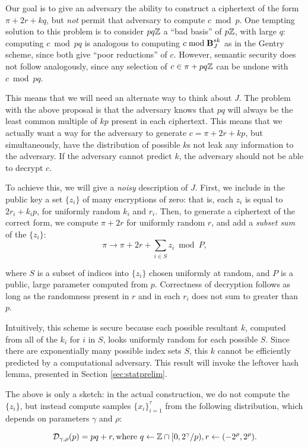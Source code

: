Our goal is to give an adversary the ability to construct a ciphertext of the form $\pi + 2r + kq$, but \emph{not} permit that adversary to compute $c \bmod p$. One tempting solution to this problem is to consider $pq \mathbb{Z}$ a ``bad basis'' of $p \mathbb{Z}$, with large $q$: computing $c \bmod pq$ is analogous to computing $c \bmod \textbf{B}_J^{sk}$ as in the Gentry scheme, since both give ``poor reductions'' of $c$. However, semantic security does not follow analogously, since any selection of $c \in \pi + pq \mathbb{Z}$ can be undone with $c \bmod pq$.

This means that we will need an alternate way to think about $J$. The problem with the above proposal is that the adversary knows that $pq$ will always be the least common multiple of $kp$ present in each ciphertext. This means that we actually want a way for the adversary to generate $c = \pi + 2r + kp$, but simultaneously, have the distribution of possible $k$s not leak any information to the adversary. If the adversary cannot predict $k$, the adversary should not be able to decrypt $c$.

To achieve this, we will give a \emph{noisy} description of $J$. First, we include in the public key a set $\{z_i\}$ of many encryptions of zero: that is, each $z_i$ is equal to $2r_{i} + k_{i}p$, for uniformly random $k_i$ and $r_i$. Then, to generate a ciphertext of the correct form, we compute $\pi + 2r$ for uniformly random $r$, and add a \emph{subset sum} of the $\{z_i\}$:
\[\pi \to \pi + 2r + \sum_{i \in S} z_i \bmod P,\]

where $S$ is a subset of indices into $\{z_i\}$ chosen uniformly at random, and $P$ is a public, large parameter computed from $p$. Correctness of decryption follows as long as the randomness present in $r$ and in each $r_i$ does not sum to greater than $p$.

Intuitively, this scheme is secure because each possible resultant $k$, computed from all of the $k_i$ for $i$ in $S$, looks uniformly random for each possible $S$. Since there are exponentially many possible index sets $S$, this $k$ cannot be efficiently predicted by a computational adversary. This result will invoke the leftover hash lemma, presented in Section \ref{sec:statprelim}.


The above is only a sketch: in the actual construction, we do not compute the $\{z_i\}$, but instead compute samples $\{x_i\}_{i = 1}^{\tau}$ from the following distribution, which depends on parameters $\gamma$ and $\rho$:

\[\mathcal{D}_{\gamma, \rho}(p) = pq+r, \text{where } q \leftarrow \mathbb{Z} \cap [0, 2^\gamma / p), r \leftarrow (-2^\rho, 2^\rho).\]

